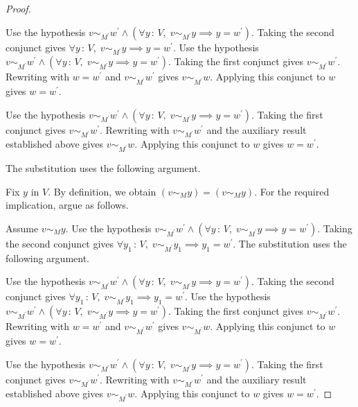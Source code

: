 \documentclass{article}
\theoremstyle{paperresult}
\newenvironment{proofstep}{\par\smallskip\ifdim\leftskip<3em\relax\advance\leftskip by 1em\relax\fi\noindent\ignorespaces}{\par\smallskip}
\begin{document}
\begin{proof}
\begin{proofstep}
\begin{proofstep}
\begin{proofstep}
\begin{proofstep}
\begin{proofstep}
\begin{proofstep}
\begin{proofstep}
Use the hypothesis \(v \sim_{M^{'}} w^{'} \land \left(\forall y\, :\, V,\; v \sim_{M^{'}} y \implies y = w^{'}\right)\).
Taking the second conjunct gives \(\forall y\, :\, V,\; v \sim_{M^{'}} y \implies y = w^{'}\).
Use the hypothesis \(v \sim_{M^{'}} w^{'} \land \left(\forall y\, :\, V,\; v \sim_{M^{'}} y \implies y = w^{'}\right)\).
Taking the first conjunct gives \(v \sim_{M^{'}} w^{'}\).
Rewriting with \(w = w^{'}\) and \(v \sim_{M^{'}} w^{'}\) gives \(v \sim_{M^{'}} w\).
Applying this conjunct to \(w\) gives \(w = w^{'}\).
\end{proofstep}
Use the hypothesis \(v \sim_{M^{'}} w^{'} \land \left(\forall y\, :\, V,\; v \sim_{M^{'}} y \implies y = w^{'}\right)\).
Taking the first conjunct gives \(v \sim_{M^{'}} w^{'}\).
Rewriting with \(v \sim_{M^{'}} w^{'}\) and the auxiliary result established above gives \(v \sim_{M^{'}} w\).
Applying this conjunct to \(w\) gives \(w = w^{'}\).
\end{proofstep}
The substitution uses the following argument.
\begin{proofstep}
Fix \(y\) in \(V\).
By definition, we obtain \(\left(v \sim_{M} y\right) = \left(v \sim_{M} y\right)\).
For the required implication, argue as follows.
\begin{proofstep}
Assume \(v \sim_{M} y\).
Use the hypothesis \(v \sim_{M^{'}} w^{'} \land \left(\forall y\, :\, V,\; v \sim_{M^{'}} y \implies y = w^{'}\right)\).
Taking the second conjunct gives \(\forall y_{1}\, :\, V,\; v \sim_{M^{'}} y_{1} \implies y_{1} = w^{'}\).
The substitution uses the following argument.
\begin{proofstep}
Use the hypothesis \(v \sim_{M^{'}} w^{'} \land \left(\forall y\, :\, V,\; v \sim_{M^{'}} y \implies y = w^{'}\right)\).
Taking the second conjunct gives \(\forall y_{1}\, :\, V,\; v \sim_{M^{'}} y_{1} \implies y_{1} = w^{'}\).
Use the hypothesis \(v \sim_{M^{'}} w^{'} \land \left(\forall y\, :\, V,\; v \sim_{M^{'}} y \implies y = w^{'}\right)\).
Taking the first conjunct gives \(v \sim_{M^{'}} w^{'}\).
Rewriting with \(w = w^{'}\) and \(v \sim_{M^{'}} w^{'}\) gives \(v \sim_{M^{'}} w\).
Applying this conjunct to \(w\) gives \(w = w^{'}\).
\end{proofstep}
Use the hypothesis \(v \sim_{M^{'}} w^{'} \land \left(\forall y\, :\, V,\; v \sim_{M^{'}} y \implies y = w^{'}\right)\).
Taking the first conjunct gives \(v \sim_{M^{'}} w^{'}\).
Rewriting with \(v \sim_{M^{'}} w^{'}\) and the auxiliary result established above gives \(v \sim_{M^{'}} w\).
Applying this conjunct to \(w\) gives \(w = w^{'}\).

\end{proofstep}
\end{proofstep}
\end{proofstep}
\end{proofstep}
\end{proofstep}
\end{proofstep}
\end{proofstep}
\end{proof}
\end{document}
